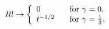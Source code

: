 \begin{equation}
Rl
   \rightarrow 
         \left\{ 
               \begin{array}{ll}
                 0 & \textrm{\,\,\, for } \gamma=0, \\
                 t^{-1/2} & \textrm{\,\,\, for } \gamma=\frac{1}{3},
               \end{array} 
         \right.
\end{equation}

